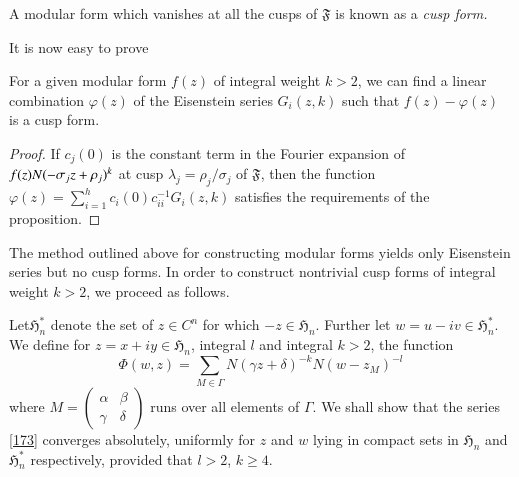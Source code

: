 A modular form which vanishes at all the cusps of $\mathfrak{F}$ is
known as a {\em cusp form.}

It is now easy to prove

\begin{proposition}\label{prop26}
For a given modular form $f(z)$ of integral weight $k>2$, we can find
a linear combination $\varphi(z)$ of the Eisenstein series
$G_{i}(z,k)$ such that $f(z)-\varphi(z)$ is a cusp form.
\end{proposition}

\begin{proof}
If $c_{j}(0)$ is the constant term in the Fourier expansion of
$f(z)\break N(-\sigma_{j}z+\rho_{j})^{k}$ at cusp
$\lambda_{j}=\rho_{j}/\sigma_{j}$ of $\mathfrak{F}$, then the function
$\varphi(z)=\sum\limits^{h}_{i=1}c_{i}(0)c^{-1}_{ii}G_{i}(z,k)$
satisfies the requirements of the proposition.
\end{proof}

The method outlined above for constructing modular forms yields only
Eisenstein series but no cusp forms. In order to construct nontrivial
cusp forms of integral weight $k>2$, we proceed as follows.

Let\pageoriginale $\mathfrak{H}^{\ast}_{n}$ denote the set of $z\in
C^{n}$ for which $-z\in\mathfrak{H}_{n}$. Further let
$w=u-iv\in\mathfrak{H}^{\ast}_{n}$. We define for
$z=x+iy\in\mathfrak{H}_{n}$, integral $l$ and integral $k>2$, the
function
\begin{equation*}
\Phi(w,z)=\sum_{M\in\Gamma}N(\gamma
z+\delta)^{-k}N(w-z_{M})^{-l}\tag{173}\label{173} 
\end{equation*}
where $M=\left(\begin{smallmatrix} \alpha & \beta\\ \gamma & \delta
\end{smallmatrix}\right)$ runs over all elements of $\Gamma$. We shall
show that the series \eqref{173} converges absolutely, uniformly for
$z$ and $w$ lying in compact sets in $\mathfrak{H}_{n}$ and
$\mathfrak{H}^{\ast}_{n}$ respectively, provided that $l>2$, $k\geq
4$.

